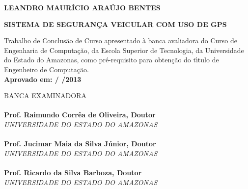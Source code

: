 \documentclass{dcctese}
\begin{document}
\newpage


\begin{center}
\bf LEANDRO MAUR\'{I}CIO ARA\'{U}JO BENTES\\[1.5 cm]
\end{center}

\begin{center}
\bf SISTEMA DE SEGURAN\c{C}A VEICULAR COM USO DE GPS\\[1.5cm]
\end{center}

\hspace*{8cm}
\begin{minipage}{8cm} 

Trabalho de Conclus\~{a}o de Curso apresentado \`{a} 
banca avaliadora do Curso de Engenharia de Computa\c{c}\~{a}o, 
da Escola Superior de Tecnologia, da Universidade do Estado do Amazonas, 
como pr\'e-requisito para obten\c{c}\~{a}o do t\'{\i}tulo de 
Engenheiro de Computa\c{c}\~{a}o.\\

\large \bf Aprovado em:  /  /2013
\end{minipage} 

BANCA EXAMINADORA\\[12 pt]

\noindent \hrulefill \hspace*{6cm} \\
\noindent \textbf{Prof. Raimundo Corr\^{e}a de Oliveira, Doutor}\\
\textit{UNIVERSIDADE DO ESTADO DO AMAZONAS}\\[0.5cm]

\noindent \hrulefill \hspace*{6cm} \\
\noindent \textbf{Prof. Jucimar Maia da Silva J\'{u}nior, Doutor}\\
\textit{UNIVERSIDADE DO ESTADO DO AMAZONAS}\\[0.5cm]

\noindent \hrulefill \hspace*{6cm} \\
\noindent \textbf{Prof. Ricardo da Silva Barboza, Doutor}\\
\textit{UNIVERSIDADE DO ESTADO DO AMAZONAS}\\

\newpage
\end{document}
